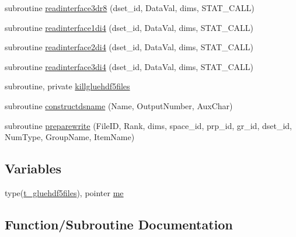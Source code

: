\begin{DoxyCompactItemize}
\item 
subroutine \mbox{\hyperlink{namespacemodulegluehdf5files_a9d59684aa45b65c72b30b9ad0578c349}{readinterface3dr8}} (dset\+\_\+id, Data\+Val, dims, S\+T\+A\+T\+\_\+\+C\+A\+LL)
\item 
subroutine \mbox{\hyperlink{namespacemodulegluehdf5files_a0d8abf73fe0fd746139f9d1d9563e66e}{readinterface1di4}} (dset\+\_\+id, Data\+Val, dims, S\+T\+A\+T\+\_\+\+C\+A\+LL)
\item 
subroutine \mbox{\hyperlink{namespacemodulegluehdf5files_a6cd5bbeb2550967007726da38e10364f}{readinterface2di4}} (dset\+\_\+id, Data\+Val, dims, S\+T\+A\+T\+\_\+\+C\+A\+LL)
\item 
subroutine \mbox{\hyperlink{namespacemodulegluehdf5files_a299ce12989f72b96cfb4d801675689ac}{readinterface3di4}} (dset\+\_\+id, Data\+Val, dims, S\+T\+A\+T\+\_\+\+C\+A\+LL)
\item 
subroutine, private \mbox{\hyperlink{namespacemodulegluehdf5files_a07002430e2da49aa4ce7da8244ca8dbd}{killgluehdf5files}}
\item 
subroutine \mbox{\hyperlink{namespacemodulegluehdf5files_a50f42179c2c16aa6c290cd9672da239b}{constructdsname}} (Name, Output\+Number, Aux\+Char)
\item 
subroutine \mbox{\hyperlink{namespacemodulegluehdf5files_a2b70cc6d35be5763a50ac4153fb03cc5}{preparewrite}} (File\+ID, Rank, dims, space\+\_\+id, prp\+\_\+id, gr\+\_\+id, dset\+\_\+id, Num\+Type, Group\+Name, Item\+Name)
\end{DoxyCompactItemize}
\subsection*{Variables}
\begin{DoxyCompactItemize}
\item 
type(\mbox{\hyperlink{structmodulegluehdf5files_1_1t__gluehdf5files}{t\+\_\+gluehdf5files}}), pointer \mbox{\hyperlink{namespacemodulegluehdf5files_a6bfec83bc34daf2b7b6eb91ee72f586f}{me}}
\end{DoxyCompactItemize}


\subsection{Function/\+Subroutine Documentation}
\mbox{\label{namespacemodulegluehdf5files_adf08cc960a9d299d5f221e46c1ec20bd}} 
